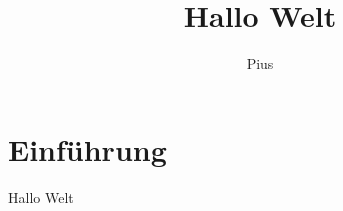 \documentclass{report}
\title{Hallo Welt}
\author{Pius}
\begin{document}
\chapter{Einführung}

Hallo Welt
\end{document}
